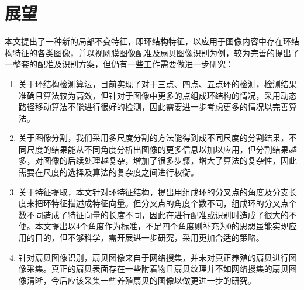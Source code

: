 \section{展望}
\label{}
本文提出了一种新的局部不变特征，即环结构特征，以应用于图像内容中存在环结构特征的各类图像，并以视网膜图像配准及扇贝图像识别为例，较为完善的提出了一整套的配准及识别方案，但仍有一些工作需要做进一步研究：
\begin{enumerate}
\item 关于环结构检测算法，目前实现了对于三点、四点、五点环的检测，检测结果准确且算法较为高效，但针对于图像中更多的点组成环结构的情况，采用动态路径移动算法不能进行很好的检测，因此需要进一步考虑更多的情况以完善算法。
\item 关于图像分割，我们采用多尺度分割的方法能得到成不同尺度的分割结果，不同尺度的结果能从不同角度分析出图像的更多信息以加以应用，但分割结果越多，对图像的后续处理越复杂，增加了很多步骤，增大了算法的复杂性，因此需要在尺度的选择及算法的复杂度之间进行权衡。
\item 关于特征提取，本文针对环特征结构，提出用组成环的分叉点的角度及分支长度来把环特征描述成特征向量。但分叉点的角度个数不同，组成环的分叉点个数不同造成了特征向量的长度不同，因此在进行配准或识别时造成了很大的不便。本文提出以4个角度作为标准，不足四个角度则补充为0的思想虽能实现应用的目的，但不够科学，需开展进一步研究，采用更加合适的策略。
\item 针对扇贝图像识别，扇贝图像来自于网络搜集，并未对真正养殖的扇贝进行图像采集。真正的扇贝表面存在一些附着物且扇贝纹理并不如网络搜集的扇贝图像清晰，今后应该采集一些养殖扇贝的图像以做更进一步的研究。
\end{enumerate}
